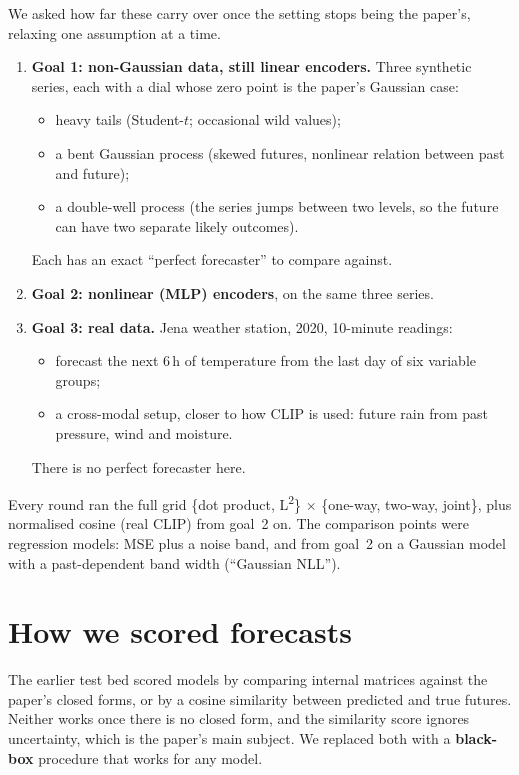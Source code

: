 \documentclass[11pt]{article}
\newcommand{\Ltwo}{L\textsuperscript{2}}
\begin{document}
We asked how far these carry over once the setting stops being the paper's,
relaxing one assumption at a time.
\begin{enumerate}
\item \textbf{Goal 1: non-Gaussian data, still linear encoders.} Three synthetic series,
  each with a dial whose zero point is the paper's Gaussian case:
  \begin{itemize}
  \item heavy tails (Student-$t$; occasional wild values);
  \item a bent Gaussian process (skewed futures, nonlinear relation between past and future);
  \item a double-well process (the series jumps between two levels, so the future can
        have two separate likely outcomes).
  \end{itemize}
  Each has an exact ``perfect forecaster'' to compare against.
\item \textbf{Goal 2: nonlinear (MLP) encoders}, on the same three series.
\item \textbf{Goal 3: real data.} Jena weather station, 2020, 10-minute readings:
  \begin{itemize}
  \item forecast the next 6\,h of temperature from the last day of six variable groups;
  \item a cross-modal setup, closer to how CLIP is used: future rain from past pressure,
        wind and moisture.
  \end{itemize}
  There is no perfect forecaster here.
\end{enumerate}
Every round ran the full grid \{dot product, \Ltwo\} $\times$ \{one-way, two-way, joint\},
plus normalised cosine (real CLIP) from goal~2 on. The comparison points were regression
models: MSE plus a noise band, and from goal~2 on a Gaussian model with a past-dependent
band width (``Gaussian NLL'').

\section{How we scored forecasts}

The earlier test bed scored models by comparing internal matrices against the paper's
closed forms, or by a cosine similarity between predicted and true futures. Neither works
once there is no closed form, and the similarity score ignores uncertainty, which is the
paper's main subject. We replaced both with a \textbf{black-box} procedure that works for
any model.
\end{document}
